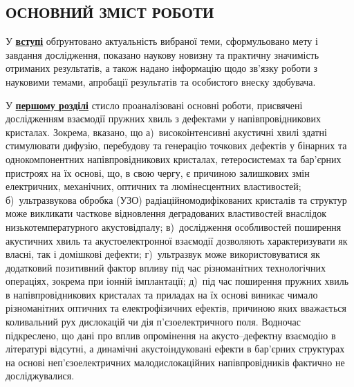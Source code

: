 

\begin{center}
\section*{\MakeUppercase{ОСНОВНИЙ ЗМІСТ РОБОТИ}}
\end{center}

У  \underline{\textbf{вступі}}  обґрунтовано актуальність  вибраної  теми, сформульовано  мету  і
завдання  дослідження, показано  наукову  новизну  та практичну  значимість
отриманих результатів, а також надано інформацію щодо зв’язку роботи з науковими темами, апробації результатів та
особистого внеску здобувача.


У  \underline{\textbf{першому розділі}}   стисло проаналізовані основні роботи, присвячені
дослідженням взаємодії пружних хвиль з дефектами у напівпровідникових кристалах.
Зокрема,
вказано, що
а)~високоінтенсивні акустичні хвилі здатні стимулювати дифузію, перебудову та генерацію точкових дефектів у бінарних та однокомпонентних напівпровідникових кристалах, гетеросистемах та бар'єрних пристроях на їх основі,
що, в свою чергу, є причиною залишкових змін електричних, механічних, оптичних та  люмінесцентних властивостей;
б)~ультразвукова обробка (УЗО) радіаційномодифікованих кристалів та структур може викликати часткове відновлення деградованих властивостей внаслідок низькотемпературного акустовідпалу;
в)~дослідження особливостей поширення акустичних хвиль та акустоелектронної взаємодії дозволяють характеризувати як власні, так і домішкові дефекти;
г)~ультразвук може використовуватися як додатковий позитивний фактор впливу під час різноманітних технологічних  операціях, зокрема при іонній імплантації;
д)~під час поширення пружних хвиль в напівпровідникових кристалах та приладах на їх основі виникає чимало різноманітних оптичних та електрофізичних ефектів, причиною яких вважається коливальний рух дислокацій чи дія п'єзоелектричного поля.
Водночас підкреслено,
що дані про вплив опромінення на акусто--дефектну взаємодію в літературі відсутні,
а динамічні акустоіндуковані ефекти в бар'єрних структурах на основі неп'єзоелектричних малодислокаційних напівпровідників фактично не досліджувалися.

